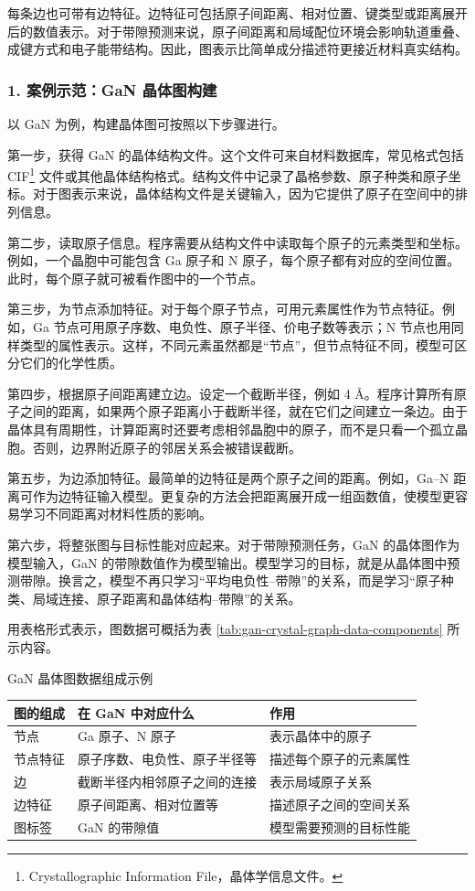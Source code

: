 每条边也可带有边特征。边特征可包括原子间距离、相对位置、键类型或距离展开后的数值表示。对于带隙预测来说，原子间距离和局域配位环境会影响轨道重叠、成键方式和电子能带结构。因此，图表示比简单成分描述符更接近材料真实结构。


\subsubsection*{\textbf{1. 案例示范：GaN 晶体图构建}}

以 GaN 为例，构建晶体图可按照以下步骤进行。


第一步，获得 GaN 的晶体结构文件。这个文件可来自材料数据库，常见格式包括 CIF\footnote{Crystallographic Information File，晶体学信息文件。} 文件或其他晶体结构格式。结构文件中记录了晶格参数、原子种类和原子坐标。对于图表示来说，晶体结构文件是关键输入，因为它提供了原子在空间中的排列信息。


第二步，读取原子信息。程序需要从结构文件中读取每个原子的元素类型和坐标。例如，一个晶胞中可能包含 Ga 原子和 N 原子，每个原子都有对应的空间位置。此时，每个原子就可被看作图中的一个节点。


第三步，为节点添加特征。对于每个原子节点，可用元素属性作为节点特征。例如，Ga 节点可用原子序数、电负性、原子半径、价电子数等表示；N 节点也用同样类型的属性表示。这样，不同元素虽然都是“节点”，但节点特征不同，模型可区分它们的化学性质。


第四步，根据原子间距离建立边。设定一个截断半径，例如 4 \AA{}。程序计算所有原子之间的距离，如果两个原子距离小于截断半径，就在它们之间建立一条边。由于晶体具有周期性，计算距离时还要考虑相邻晶胞中的原子，而不是只看一个孤立晶胞。否则，边界附近原子的邻居关系会被错误截断。


第五步，为边添加特征。最简单的边特征是两个原子之间的距离。例如，Ga--N 距离可作为边特征输入模型。更复杂的方法会把距离展开成一组函数值，使模型更容易学习不同距离对材料性质的影响。


第六步，将整张图与目标性能对应起来。对于带隙预测任务，GaN 的晶体图作为模型输入，GaN 的带隙数值作为模型输出。模型学习的目标，就是从晶体图中预测带隙。换言之，模型不再只学习“平均电负性--带隙”的关系，而是学习“原子种类、局域连接、原子距离和晶体结构--带隙”的关系。


用表格形式表示，图数据可概括为表 \ref{tab:gan-crystal-graph-data-components} 所示内容。


\begin{formalTable}[htbp]
\caption{GaN 晶体图数据组成示例}
\label{tab:gan-crystal-graph-data-components}
\begin{tabularx}{\textwidth}{@{}YYY@{}}
\toprule
\textbf{图的组成} & \textbf{在 GaN 中对应什么} & \textbf{作用} \\
\midrule
节点 & Ga 原子、N 原子 & 表示晶体中的原子 \\
节点特征 & 原子序数、电负性、原子半径等 & 描述每个原子的元素属性 \\
边 & 截断半径内相邻原子之间的连接 & 表示局域原子关系 \\
边特征 & 原子间距离、相对位置等 & 描述原子之间的空间关系 \\
图标签 & GaN 的带隙值 & 模型需要预测的目标性能 \\
\bottomrule
\end{tabularx}
\end{formalTable}

